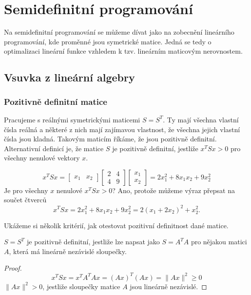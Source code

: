 \chapter{Semidefinitní programování}

Na semidefinitní programování se můžeme dívat jako na zobecnění lineárního programování, kde proměnné jsou symetrické matice. Jedná se tedy o optimalizaci lineární funkce vzhledem k tzv. lineárním maticovým nerovnostem.

\section{Vsuvka z lineární algebry}

\subsection*{Pozitivně definitní matice}

Pracujeme s reálnými symetrickými maticemi $S = S^T$. Ty mají všechna vlastní čísla reálná a některé z nich mají zajímavou vlastnost, že všechna jejich vlastní čísla jsou kladná. Takovým maticím říkáme, že jsou pozitivně definitní. Alternativní definicí je, že matice $S$ je pozitivně definitní, jestliže $x^TSx > 0$ pro všechny nenulové vektory $x$.

\begin{pr}
$$
    x^T S x = 
    \begin{bmatrix}
        x_1 & x_2
    \end{bmatrix}
    \begin{bmatrix}
        2 & 4 \\
        4 & 9
    \end{bmatrix}
    \begin{bmatrix}
        x_1 \\
        x_2
    \end{bmatrix} =
    2 x_1^2 + 8 x_1 x_2 + 9 x_2^2
$$
Je pro všechny $x$ nenulové $x^TSx > 0$? Ano, protože můžeme výraz přepsat na součet čtverců
$$
    x^TSx = 2 x_1^2 + 8 x_1 x_2 + 9 x_2^2 = 2 (x_1 + 2 x_2)^2 + x_2^2.
$$
\end{pr}

Ukážeme si několik kritérií, jak otestovat pozitivní definitnost dané matice.

\begin{vt}
    $S = S^T$ je pozitivně definitní, jestliže lze napsat jako $S = A^T A$ pro nějakou matici $A$, která má lineárně nezávislé sloupečky.
\end{vt}
\begin{proof}
    \begin{equation}
    \label{eq:tmp}
        x^TSx = x^TA^TAx = (Ax)^T(Ax) = \lVert Ax \rVert^2 \geq 0
    \end{equation}
    $\lVert Ax \rVert^2 > 0$, jestliže sloupečky matice $A$ jsou lineárně nezávislé.
\end{proof}

